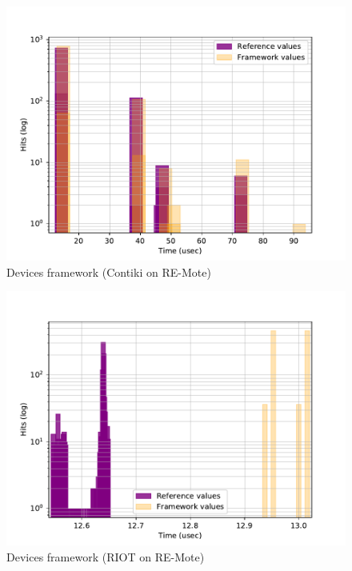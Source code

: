 \documentclass{beamer}
\begin{document}
\begin{frame}
  \begin{figure}
    \includegraphics[scale=0.4]{assets/comparison-devices-framework-contiki-remote.pdf}
    \caption{Devices framework (Contiki on RE-Mote)}
  \end{figure}
\end{frame}

\begin{frame}
  \begin{figure}
    \includegraphics[scale=0.4]{assets/comparison-devices-framework-riot-remote.pdf}
    \caption{Devices framework (RIOT on RE-Mote)}
  \end{figure}
\end{frame}
\end{document}
